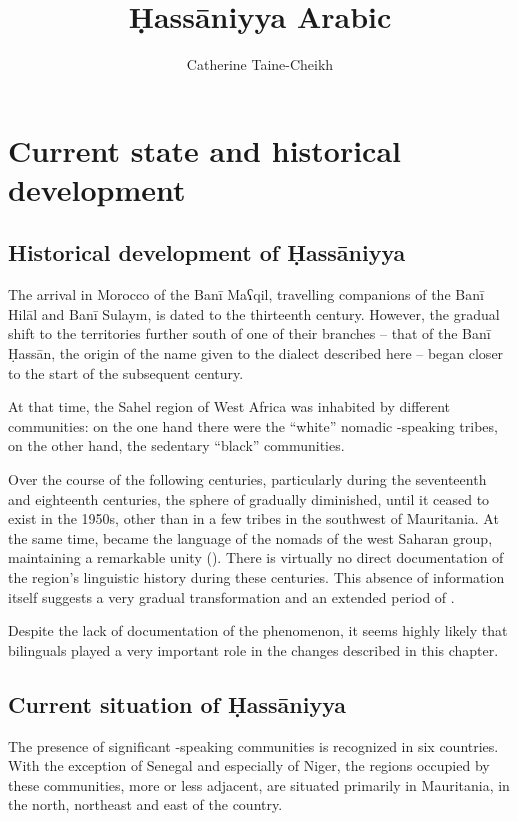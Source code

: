 \documentclass[output=paper]{langsci/langscibook}
\author{Catherine Taine-Cheikh\affiliation{CNRS, LACITO}}
\title{Ḥassāniyya Arabic}
\begin{document}
\maketitle 
 

\section{Current state and historical development}

\subsection{Historical development of Ḥassāniyya} %

The arrival in Morocco of the Banī Maʕqil, travelling companions of the Banī Hilāl and Banī Sulaym, is dated to the thirteenth century. However, the gradual shift to the territories further south of one of their branches – that of the Banī Ḥassān, the origin of the name given to the dialect described here – began closer to the start of the subsequent century. 

At that time, the Sahel region of West Africa was inhabited by different communities: on the one hand there were the “white” nomadic -speaking tribes, on the other hand, the sedentary “black” communities.

Over the course of the following centuries, particularly during the seventeenth and eighteenth centuries, the sphere of   gradually diminished, until it ceased to exist in the 1950s, other than in a few tribes in the southwest of Mauritania. At the same time,   became the language of the nomads of the west Saharan group, maintaining a remarkable unity (\citealt{Taine-Cheikh2016,Taine-Cheikh2018historical}). There is virtually no direct documentation of the region’s linguistic history during these centuries. This absence of information itself suggests a very gradual transformation and an extended period of .

Despite the lack of documentation of the  phenomenon, it seems highly likely that bilinguals played a very important role in the changes described in this chapter. 

\subsection{Current situation of Ḥassāniyya} %

The presence of significant -speaking communities is recognized in six countries. With the exception of Senegal and especially of Niger, the regions occupied by these communities, more or less adjacent, are situated primarily in Mauritania, in the north, northeast and east of the country. 
\end{document}
